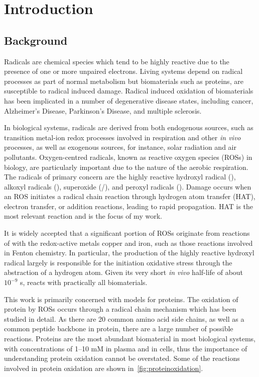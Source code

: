 
 \chapter{Introduction}

\section{Background}
Radicals are chemical species which tend to be highly reactive due to the presence of one or more unpaired electrons. Living systems depend on radical processes as part of normal metabolism but biomaterials such as proteins, are susceptible to radical induced damage. Radical induced oxidation of biomaterials has been implicated in a number of degenerative disease states, including cancer, Alzheimer's Disease, Parkinson's Disease, and multiple sclerosis.\cite{Barnham2004,Halliwell2007,Valko2007,Hwang2013,Halliwell2015}

In biological systems, radicals are derived from both endogenous sources, such as transition metal-ion redox processes involved in respiration and other \emph{in vivo} processes, as well as exogenous sources, for instance, solar radiation and air pollutants. Oxygen-centred radicals, known as reactive oxygen species (ROSs) in biology, are particularly important due to the nature of the aerobic respiration. The radicals of primary concern are the highly reactive hydroxyl radical (), alkoxyl radicals (), superoxide (/), and peroxyl radicals ().\cite{Halliwell2015} Damage occurs when an ROS initiates a radical chain reaction through hydrogen atom transfer (HAT), electron transfer, or addition reactions, leading to rapid propagation. HAT is the most relevant reaction and is the focus of my work.

It is widely accepted that a significant portion of ROSs originate from reactions of  with the redox-active metals copper and iron,\cite{Halliwell2015} such as those reactions involved in Fenton chemistry.\cite{Stohs1995} In particular, the production of the highly reactive hydroxyl radical largely is responsible for the initiation oxidative stress through the abstraction of a hydrogen atom. Given its very short \emph{in vivo} half-life of about $10^{-9}$ s,  reacts with practically all biomaterials.\cite{Sies1993}

This work is primarily concerned with models for proteins. The oxidation of protein by ROSs occurs through a radical chain mechanism which has been studied in detail.\cite{Berlett1997,Davies2016} As there are 20 common amino acid side chains, as well as a common peptide backbone in protein, there are a large number of possible reactions. Proteins are the most abundant biomaterial in most biological systems, with concentrations of 1--10 mM in plasma and in cells\cite{Davies2005}, thus the importance of understanding protein oxidation cannot be overstated. Some of the reactions involved in protein oxidation are shown in~\ref{fig:proteinoxidation}.

